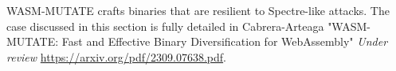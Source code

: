 





\begin{tcolorbox}[title=Contribution paper,boxrule=1pt,arc=.2em,boxsep=1.0mm]
    WASM-MUTATE crafts \Wasm binaries that are resilient to Spectre-like attacks. 
    The case discussed in this section is fully detailed in Cabrera-Arteaga \etal "WASM-MUTATE: Fast and Effective Binary Diversification for WebAssembly"
    \emph{Under review}
    \url{https://arxiv.org/pdf/2309.07638.pdf}. 
\end{tcolorbox}



